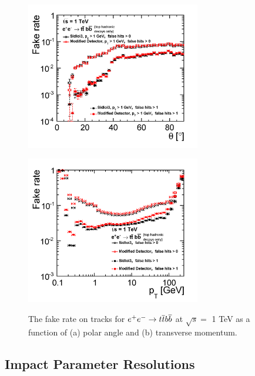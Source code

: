 \begin{figure}
\begin{minipage}{.5\textwidth}
\centering
\includegraphics[width=3.0in]{ttbb6qallFakeRateTheta_sidloi3_det_vtxbar_3doublet.png}
\label{fig:ttbbfakeratetheta}
\end{minipage}
\begin{minipage}{.5\textwidth}
\centering
\includegraphics[width=3.0in]{ttbb6qallFakeRatePt_sidloi3_det_vtxbar_3doublet.png}
\label{fig:ttbbfakeratept}
\end{minipage}
\caption{The fake rate on tracks for $\ee \rightarrow \ttbar \bbbar$ at $ \sqrt{s} = $ 1 TeV as a function of (a) polar angle and
 (b) transverse momentum.}
\label{fig:ttbbfakerate}
\end{figure}

\subsection{Impact Parameter Resolutions}
